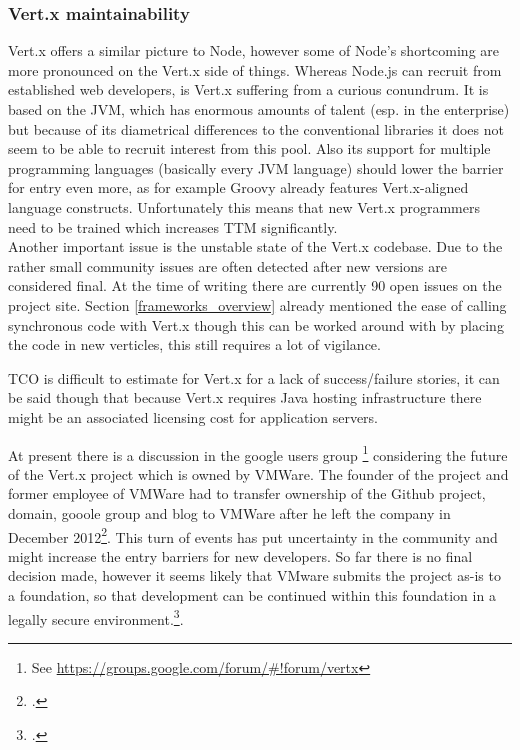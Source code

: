 \subsubsection{Vert.x maintainability}
\label{vertx_maintainability}
Vert.x offers a similar picture to Node, however some of Node's shortcoming are
more pronounced on the Vert.x side of things. Whereas Node.js can recruit from
established web developers, is Vert.x suffering from a curious conundrum. It is
based on the JVM, which has enormous amounts of talent (esp. in the enterprise)
but because of its diametrical differences to the conventional libraries it does
not seem to be able to recruit interest from this pool. Also its support for
multiple programming languages (basically every JVM language) should lower the
barrier for entry even more, as for example Groovy already features
Vert.x-aligned language constructs. Unfortunately this means that new Vert.x
programmers need to be trained which increases TTM significantly.\\
Another important issue is the unstable state of the Vert.x codebase. Due to the
rather small community issues are often detected after new versions are considered final.
At the time of writing there are currently 90 open issues on the project site.
Section \ref{frameworks_overview} already mentioned the ease of calling synchronous code with Vert.x though this
can be worked around with by placing the code in new verticles, this still
requires a lot of vigilance.

TCO is difficult to estimate for Vert.x for a lack of success/failure stories,
it can be said though that because Vert.x requires Java hosting infrastructure
there might be an associated licensing cost for application servers.

At present there is a discussion in the google users group
\footnote{See \url{https://groups.google.com/forum/\#!forum/vertx}} considering the future of
the Vert.x project which is owned by VMWare. The founder of the project and
former employee of VMWare had to transfer ownership of the Github project,
domain, gooole group and blog to VMWare after he left the company in December
2012\footcite[Cf.][]{Vertx_announcement_2013}. This turn of events has put
uncertainty in the community and might increase the entry barriers for new
developers. So far there is no final decision made, however it seems likely that VMware
submits the project as-is to a foundation, so that development can be continued
within this foundation in a legally secure environment.\footcite[Cf.][]{Vertx_future_2013}.

